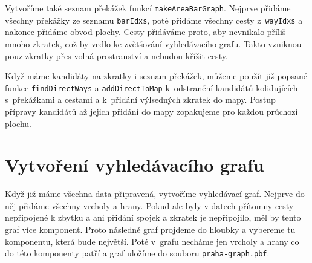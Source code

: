 Vytvoříme také seznam překážek funkcí \verb|makeAreaBarGraph|. Nejprve přidáme
všechny překážky ze seznamu \verb|barIdxs|, poté přidáme všechny cesty
z~\verb|wayIdxs| a nakonec přidáme obvod plochy. Cesty přidáváme proto, aby
nevnikalo příliš mnoho zkratek, což by vedlo ke zvětšování vyhledávacího grafu.
Takto vzniknou pouz zkratky přes volná prostranství a nebudou křížit cesty.

Když máme kandidáty na zkratky i seznam překážek, můžeme použít již popsané funkce
\verb|findDirectWays| a \verb|addDirectToMap| k~odstranění kandidátů
kolidujících
s~překážkami a cestami a k~přidání výlsedných zkratek do mapy. Postup přípravy
kandidátů až jejich přidání do mapy zopakujeme pro každou průchozí plochu.


\section{Vytvoření vyhledávacího grafu}
Když již máme všechna data připravená, vytvoříme vyhledávací graf. Nejprve do
něj přidáme všechny vrcholy a hrany. Pokud ale byly v datech přítomny cesty
nepřipojené k zbytku a ani přidání spojek a zkratek je nepřipojilo, měl by tento
graf více komponent. Proto následně graf projdeme do hloubky a vybereme tu
komponentu, která bude největší. Poté v~grafu necháme jen vrcholy a hrany co do
této komponenty patří a graf uložíme do souboru \verb|praha-graph.pbf|. 
